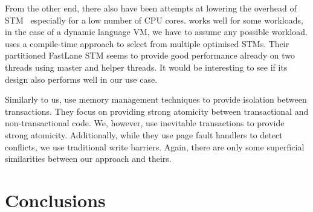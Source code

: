 \documentclass{sigplanconf}
\begin{document}
From the other end, there also have been attempts at lowering the
overhead of STM~\cite{warmhoff13,spear09} especially for a low number
of CPU cores. \cite{spear09} works well for some workloads, in the
case of a dynamic language VM, we have to assume any possible
workload.  \cite{warmhoff13} uses a compile-time approach to select
from multiple optimised STMs. Their partitioned FastLane STM seems to
provide good performance already on two threads using master and
helper threads. It would be interesting to see if its design also
performs well in our use case.

Similarly to us, \cite{martin09} use memory management techniques to
provide isolation between transactions. They focus on providing strong
atomicity between transactional and non-transactional code.  We,
however, use inevitable transactions to provide strong atomicity.
Additionally, while they use page fault handlers to detect conflicts,
we use traditional write barriers. Again, there are only some
superficial similarities between our approach and theirs.





\section{Conclusions}
\end{document}
